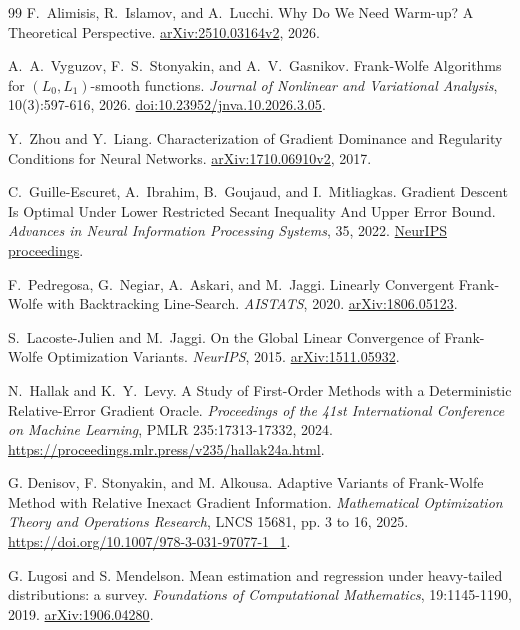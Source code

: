 \begin{thebibliography}{99}
F.~Alimisis, R.~Islamov, and A.~Lucchi.
Why Do We Need Warm-up? A Theoretical Perspective.
\href{https://arxiv.org/abs/2510.03164v2}{arXiv:2510.03164v2}, 2026.

A.~A.~Vyguzov, F.~S.~Stonyakin, and A.~V.~Gasnikov.
Frank-Wolfe Algorithms for $(L_0,L_1)$-smooth functions.
\emph{Journal of Nonlinear and Variational Analysis}, 10(3):597-616, 2026.
\href{https://doi.org/10.23952/jnva.10.2026.3.05}{doi:10.23952/jnva.10.2026.3.05}.

Y.~Zhou and Y.~Liang.
Characterization of Gradient Dominance and Regularity Conditions for Neural Networks.
\href{https://arxiv.org/abs/1710.06910v2}{arXiv:1710.06910v2}, 2017.

C.~Guille-Escuret, A.~Ibrahim, B.~Goujaud,
and I.~Mitliagkas.
Gradient Descent Is Optimal Under Lower Restricted Secant Inequality
And Upper Error Bound.
\emph{Advances in Neural Information Processing Systems}, 35, 2022.
\href{https://proceedings.neurips.cc/paper_files/paper/2022/file/9daab3b451038ed1bc5d8e9b77996b99-Paper-Conference.pdf}{NeurIPS proceedings}.

F.~Pedregosa, G.~Negiar, A.~Askari, and M.~Jaggi.
Linearly Convergent Frank-Wolfe with Backtracking Line-Search.
\emph{AISTATS}, 2020. \href{https://arxiv.org/abs/1806.05123}{arXiv:1806.05123}.

S.~Lacoste-Julien and M.~Jaggi.
On the Global Linear Convergence of Frank-Wolfe Optimization Variants.
\emph{NeurIPS}, 2015.
\href{https://arxiv.org/abs/1511.05932}{arXiv:1511.05932}.

N.~Hallak and K.~Y.~Levy.
A Study of First-Order Methods with a Deterministic Relative-Error Gradient Oracle.
\emph{Proceedings of the 41st International Conference on Machine Learning},
PMLR 235:17313-17332, 2024.
\url{https://proceedings.mlr.press/v235/hallak24a.html}.

G. Denisov, F. Stonyakin, and M. Alkousa.
Adaptive Variants of Frank-Wolfe Method with Relative Inexact
Gradient Information.
\emph{Mathematical Optimization Theory and Operations Research},
LNCS 15681, pp. 3 to 16, 2025.
\url{https://doi.org/10.1007/978-3-031-97077-1_1}.

G. Lugosi and S. Mendelson.
Mean estimation and regression under heavy-tailed distributions: a survey.
\emph{Foundations of Computational Mathematics}, 19:1145-1190, 2019.
\href{https://arxiv.org/abs/1906.04280}{arXiv:1906.04280}.


\end{thebibliography}
